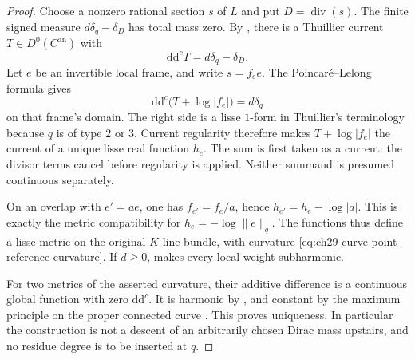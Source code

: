\begin{proof}
Choose a nonzero rational section \(s\) of \(L\) and put
\(D=\operatorname{div}(s)\).  The finite signed measure
\(d\delta_q-\delta_D\) has total mass zero.  By
\cite[Theorem~3.3.13(ii)]{Thu05}, there is a Thuillier current
\(T\in D^0(C^{\mathrm{an}})\) with
\begin{equation}
\label{eq:ch29-curve-reference-current}
              \mathrm d\mathrm d^cT=d\delta_q-\delta_D.
\end{equation}
Let \(e\) be an invertible local frame, and write \(s=f_e e\).
The Poincar\'e--Lelong formula gives
\[
 \mathrm d\mathrm d^c\bigl(T+\log|f_e|\bigr)=d\delta_q
\]
on that frame's domain.  The right side is a lisse \(1\)-form in
Thuillier's terminology because \(q\) is of type \(2\) or \(3\).
Current regularity \cite[Proposition~3.3.11]{Thu05} therefore makes
\(T+\log|f_e|\) the current of a unique lisse real function \(h_e\).
The sum is first taken as a current: the divisor terms cancel before
regularity is applied.  Neither summand is presumed continuous
separately.

On an overlap with \(e'=a e\), one has \(f_{e'}=f_e/a\), hence
\(h_{e'}=h_e-\log|a|\).  This is exactly the metric compatibility
for \(h_e=-\log\lVert e\rVert_q\).  The functions thus define a
lisse metric on the original \(K\)-line bundle, with curvature
\eqref{eq:ch29-curve-point-reference-curvature}.  If \(d\geq0\),
\cite[Theorem~3.4.12(ii)]{Thu05} makes every local weight subharmonic.

For two metrics of the asserted curvature, their additive difference
is a continuous global function with zero \(\mathrm d\mathrm d^c\).
It is harmonic by \cite[Lemma~3.3.12]{Thu05}, and constant by the
maximum principle on the proper connected curve
\cite[Proposition~3.1.1]{Thu05}.  This proves uniqueness.  In particular
the construction is not a descent of an arbitrarily chosen Dirac mass
upstairs, and no residue degree is to be inserted at \(q\).
\end{proof}


